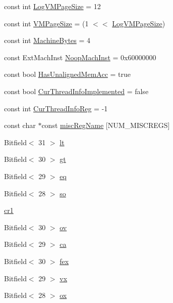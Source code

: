 \begin{DoxyCompactItemize}
\item 
const int \hyperlink{namespacePowerISA_a554fef169d109a5ccb7ce0dd6a43e521}{LogVMPageSize} = 12
\item 
const int \hyperlink{namespacePowerISA_a891eaf95159d764e6efae501c2860a3a}{VMPageSize} = (1 $<$$<$ \hyperlink{namespacePowerISA_a554fef169d109a5ccb7ce0dd6a43e521}{LogVMPageSize})
\item 
const int \hyperlink{namespacePowerISA_a8f4ba87c53caab23396d3b86b672b0fb}{MachineBytes} = 4
\item 
const ExtMachInst \hyperlink{namespacePowerISA_a8d1e39e0ea757dcc9725c6ccd81dd4c4}{NoopMachInst} = 0x60000000
\item 
const bool \hyperlink{namespacePowerISA_a1c3adbc67ce574fe545e332d3bc677be}{HasUnalignedMemAcc} = true
\item 
const bool \hyperlink{namespacePowerISA_a9faf3aac879cfa867d4ae15d4119c45e}{CurThreadInfoImplemented} = false
\item 
const int \hyperlink{namespacePowerISA_a7e5bf2f33f34327efc1eeccbb0c1141f}{CurThreadInfoReg} = -\/1
\item 
const char $\ast$const \hyperlink{namespacePowerISA_a25c189cc6686d2796be597f69b3a94a6}{miscRegName} \mbox{[}NUM\_\-MISCREGS\mbox{]}
\item 
Bitfield$<$ 31 $>$ \hyperlink{namespacePowerISA_afaddb364ab967e030e35c845e8f9cc5e}{lt}
\item 
Bitfield$<$ 30 $>$ \hyperlink{namespacePowerISA_a73053d25e50297e1394dd73b90816e43}{gt}
\item 
Bitfield$<$ 29 $>$ \hyperlink{namespacePowerISA_a9d2b59e69f0498a5cc37a71ba578920c}{eq}
\item 
Bitfield$<$ 28 $>$ \hyperlink{namespacePowerISA_afe7194d4c241ed83e4a1f9cdc8e7be0d}{so}
\item 
\hyperlink{namespacePowerISA_a1dae322bf8ef83af996e2e1534f3036d}{cr1}
\item 
Bitfield$<$ 30 $>$ \hyperlink{namespacePowerISA_a186f045af2f938c2fac77f8e6656b693}{ov}
\item 
Bitfield$<$ 29 $>$ \hyperlink{namespacePowerISA_a103ecf74d510034f16278decd1fc9f34}{ca}
\item 
Bitfield$<$ 30 $>$ \hyperlink{namespacePowerISA_a84ae18295720ae3dbeeea2356b67257d}{fex}
\item 
Bitfield$<$ 29 $>$ \hyperlink{namespacePowerISA_aa86e07da1b9cc370b9d96d14eac0a104}{vx}
\item 
Bitfield$<$ 28 $>$ \hyperlink{namespacePowerISA_a624be297d49dd726a1d6b9925a9b9c23}{ox}
$$
\end{DoxyCompactItemize}
